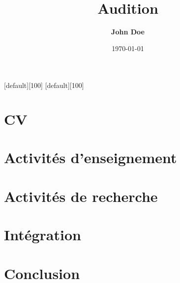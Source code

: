 \documentclass{beamer}
\title{Audition}
\author[John Doe]{\bfseries John Doe}
\institute{Université}
\date[19/05/15]{\today}
\begin{document}
{   
[default][100]
[default][100]
}

\section{CV}
\frame{}\frame{}\frame{}

\section{Activités d'enseignement}
\frame{}\frame{}\frame{}\frame{}

\section{Activités de recherche}
\frame{}\frame{}\frame{}\frame{}

\section{Intégration}
\frame{}\frame{}\frame{}\frame{}

\section{Conclusion}
\frame{}
\end{document}
